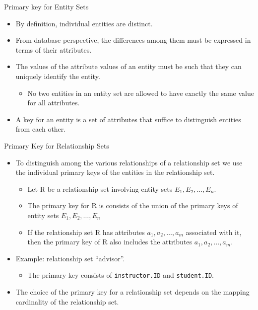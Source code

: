 \documentclass{beamer}
\begin{document}
\begin{frame}{Primary key for Entity Sets}
    \begin{itemize}
        \item By definition, individual entities are distinct.
        \item From database perspective, the differences among them must be expressed in terms of their attributes.
        \item The values of the attribute values of an entity must be such that they can uniquely identify the entity.
        \begin{itemize}
            \item No two entities in an entity set are allowed to have exactly the same value for all attributes.
        \end{itemize}
        \item A key for an entity is a set of attributes that suffice to distinguish entities from each other.
    \end{itemize}
\end{frame}

\begin{frame}{Primary Key for Relationship Sets}
    \begin{itemize}
        \item To distinguish among the various relationships of a relationship set we use the individual primary keys of the entities in the relationship set.
        \begin{itemize}
            \item Let R be a relationship set involving entity sets $E_1, E_2, \ldots, E_n$.
            \item The primary key for R is consists of the union of the primary keys of entity sets $E_1, E_2, \ldots, E_n$
            \item If the relationship set R has attributes $a_1, a_2, \ldots, a_m$ associated with it, then the primary key of R also includes the attributes $a_1, a_2, \ldots, a_m$.
        \end{itemize}
        \item Example: relationship set ``advisor''.
        \begin{itemize}
            \item The primary key consists of \texttt{instructor.ID} and \texttt{student.ID}.
        \end{itemize}
        \item The choice of the primary key for a relationship set depends on the mapping cardinality of the relationship set.
    \end{itemize}
\end{frame}
\end{document}
